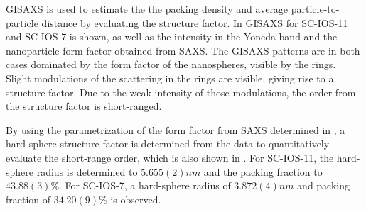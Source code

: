 \documentclass[\main/dresen_thesis.tex]{subfiles}
\begin{document}
  \label{sec:looselyPackedNS:layers:gisaxs}
  GISAXS is used to estimate the the packing density and average particle-to-particle distance by evaluating the structure factor.
  In  GISAXS for SC-IOS-11 and SC-IOS-7 is shown, as well as the intensity in the Yoneda band and the nanoparticle form factor obtained from SAXS.
  The GISAXS patterns are in both cases dominated by the form factor of the nanospheres, visible by the rings.
  Slight modulations of the scattering in the rings are visible, giving rise to a structure factor.
  Due to the weak intensity of those modulations, the order from the structure factor is short-ranged.

  By using the parametrization of the form factor from SAXS determined in , a hard-sphere structure factor is determined from the data to quantitatively evaluate the short-range order, which is also shown in .
  For SC-IOS-11, the hard-sphere radius is determined to $5.655(2) \unit{nm}$ and the packing fraction to $43.88(3) \%$.
  For SC-IOS-7, a hard-sphere radius of $3.872(4) \unit{nm}$ and packing fraction of $34.20(9) \%$ is observed.
\end{document}

